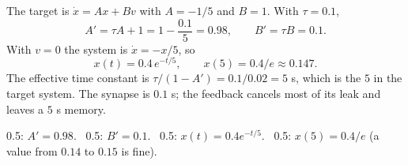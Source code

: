 \documentclass[11pt,letterpaper]{article}
\newcommand{\ans}[1]{\par\vspace{4pt}{\bfseries #1}\quad}
\begin{document}
\ans{(a) [2]}
The target is $\dot x = Ax + Bv$ with $A = -1/5$ and $B = 1$. With $\tau = 0.1$,
\[
A' = \tau A + 1 = 1 - \frac{0.1}{5} = \mathbf{0.98}, \qquad B' = \tau B = \mathbf{0.1}.
\]
With $v = 0$ the system is $\dot x = -x/5$, so
\[
x(t) = 0.4\,e^{-t/5}, \qquad x(5) = 0.4/e \approx \mathbf{0.147}.
\]
The effective time constant is $\tau/(1 - A') = 0.1/0.02 = 5$ s, which is the $5$ in the target system. The synapse is $0.1$ s; the feedback cancels most of its leak and leaves a $5$ s memory.
\begin{center}
\end{center}
\begin{marking}
0.5: $A' = 0.98$. \ 0.5: $B' = 0.1$. \ 0.5: $x(t) = 0.4e^{-t/5}$. \ 0.5: $x(5) = 0.4/e$ (a value from $0.14$ to $0.15$ is fine).
\end{marking}
\end{document}
